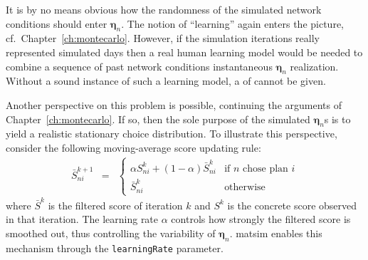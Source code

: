 %
It is by no means obvious how the randomness of the simulated network conditions 
should enter $\boldsymbol{\eta}_n$.
%
%
The notion of {}``learning'' again enters the picture,
cf.~Chapter~\ref{ch:montecarlo}. However, if the simulation iterations really
represented simulated days then a real human learning model would be needed 
to combine a sequence of past network conditions 
instantaneous $\boldsymbol{\eta}_n$ realization. 
Without a sound instance of such a learning model,
a  of
 cannot be given.

Another perspective on this problem is possible, continuing
the arguments of Chapter~\ref{ch:montecarlo}.  If so,
then the sole purpose of the simulated $\boldsymbol{\eta}_n$s is to yield a realistic stationary choice distribution. To
illustrate this perspective, consider the following moving-average score
updating rule:
\begin{eqnarray}
\bar{S}_{ni}^{k+1} & = & \begin{cases}
\alpha S_{ni}^{k} + (1 - \alpha)\bar{S}_{ni}^{k} & \text{if }n\text{ chose plan }i\\
\bar{S}_{ni}^{k} & \text{otherwise}
\end{cases}
\end{eqnarray}
where $\bar{S}^{k}$ is the filtered score of iteration $k$ and $S^{k}$
is the concrete score observed in that iteration. The learning rate $\alpha$
controls how strongly the filtered score is smoothed out, thus
controlling the variability of $\boldsymbol{\eta}_n$. \gls{matsim} enables this mechanism
through the \lstinline{learningRate} parameter.

